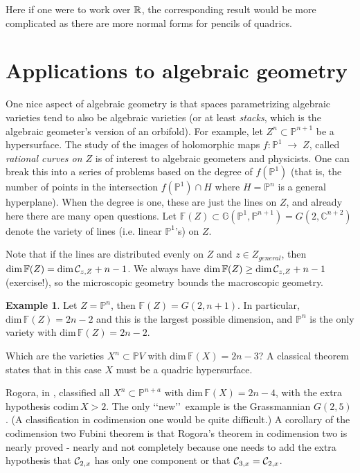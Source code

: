 \documentclass[11pt]{amsart}
\theoremstyle{definition}
\newtheorem{example}[theorem]{Example}
\theoremstyle{remark}
\numberwithin{equation}{section}
\def\BC{\mathbb C}\def\BF{\mathbb F}\def\BO{\mathbb O}\def\BS{\mathbb S}
\def\BG{\mathbb G}
\def\BP{\mathbb P}
\def\pp#1{\mathbb P^{#1}}
\def\pp#1{{\mathbb P}^{#1}}
\def\tdim{\rm dim}
\def\ra{{\mathord{\;\rightarrow\;}}}
\def\tdim{\text{dim}\,}
\def\tcodim{\text{codim}\,}
\begin{document}
Here if one were to work over $\mathbb R$, the corresponding result would be more
complicated as there are more normal forms for pencils of quadrics.

\section{Applications to algebraic geometry}

One nice aspect of algebraic geometry is that spaces parametrizing
algebraic varieties tend to also be algebraic varieties (or at 
least {\it stacks}, which is the algebraic geometer's version of
an orbifold). For example, let $Z^n\subset \pp{n+1}$ be a hypersurface.
The study of the images of holomorphic maps $f:\pp 1\ra Z$, called
{\it rational curves on $Z$} is of interest to algebraic geometers
and physicists. One can break this into a series of problems
based on the degree of $f(\pp 1)$ (that is, the number of
points in the intersection $f(\pp 1)\cap H$ where $H=\pp{n}$ is
a general hyperplane). When the degree is one, these are just
the lines on $Z$, and already here there are many open questions.
Let $\BF(Z)\subset \BG(\pp 1,\pp{n+1})=G(2,\BC^{n+2})$ denote
the variety of lines (i.e. linear $\pp 1$'s) on $Z$. 

Note that if the lines are distributed evenly on 
$Z$ and $z\in Z_{general}$, then $\tdim \BF(Z)=\tdim \cC_{z,Z}+ n-1$.  
 We always have 
$\tdim\BF(Z)\geq \tdim \cC_{z,Z}+ n-1$ (exercise!), so the microscopic geometry
bounds the macroscopic geometry.

 
\begin{example} Let $Z=\pp n$, then $\BF(Z)=G(2,n+1)$. In particular,
$\tdim\BF(Z) =2n-2$ and this is the largest possible
dimension, and $\pp n$ is the only variety with
$\tdim\BF(Z)= 2n-2$.
\end{example}

Which are the varieties $X^n\subset \BP V$
with $\tdim \BF(X)=2n-3$?  A classical theorem states that
in this case $X$ must be a quadric hypersurface.

Rogora, in \cite{Rogora}, classified all $X^n\subset\pp{n+a}$ with
$\tdim \BF(X)=2n-4$,  with the extra hypothesis $\tcodim X> 2$. The
only \lq\lq new\rq\rq\  example is the Grassmannian $G(2,5)$.  
(A classification in codimension one would be quite difficult.)
A corollary of the codimension two Fubini theorem is that   Rogora's theorem 
in codimension two is nearly proved - nearly 
and not completely because
one needs to add the extra hypothesis that ${\mathcal C}_{2,x}$ has only
one component or that ${\mathcal C}_{3,x}={\mathcal C}_{2,x}$.
\end{document}
